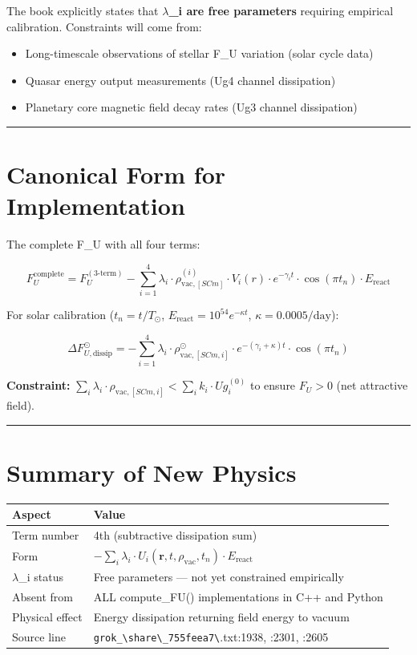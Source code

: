 \documentclass[12pt,a4paper]{article}
\begin{document}
The book explicitly states that \textbf{$\lambda$\_i are free parameters} requiring empirical calibration. Constraints will come from:

\begin{itemize}
  \item Long-timescale observations of stellar F\_U variation (solar cycle data)
  \item Quasar energy output measurements (Ug4 channel dissipation)
  \item Planetary core magnetic field decay rates (Ug3 channel dissipation)
\end{itemize}

\medskip\hrule\medskip

\section{Canonical Form for Implementation}

The complete F\_U with all four terms:

\begin{equation}
F_U^{\text{complete}} = F_U^{(3\text{-term})} - \sum_{i=1}^{4} \lambda_i \cdot \rho_{\text{vac},[SCm]}^{(i)} \cdot V_i(r) \cdot e^{-\gamma_i t} \cdot \cos(\pi t_n) \cdot E_{\text{react}}
\end{equation}

For solar calibration ($t_n = t/T_\odot$, $E_{\text{react}} = 10^{54} e^{-\kappa t}$, $\kappa = 0.0005/\text{day}$):

\begin{equation}
\Delta F_{U,\text{dissip}}^{\odot} = -\sum_{i=1}^{4} \lambda_i \cdot \rho_{\text{vac},[SCm,i]}^{\odot} \cdot e^{-(\gamma_i + \kappa)t} \cdot \cos(\pi t_n)
\end{equation}

\textbf{Constraint:} $\sum_i \lambda_i \cdot \rho_{\text{vac},[SCm,i]} < \sum_i k_i \cdot Ug_i^{(0)}$ to ensure $F_U > 0$ (net attractive field).

\medskip\hrule\medskip

\section{Summary of New Physics}

\begin{table}[H]
\centering
\small
\begin{tabularx}{\linewidth}{@{}>{\raggedright\arraybackslash}X>{\raggedright\arraybackslash}X@{}}
\toprule
Aspect & Value \tabularnewline
\midrule
Term number & 4th (subtractive dissipation sum) \tabularnewline
Form & $-\sum_i \lambda_i \cdot U_i(\mathbf{r},t,\rho_{\text{vac}},t_n) \cdot E_{\text{react}}$ \tabularnewline
$\lambda$\_i status & Free parameters --- not yet constrained empirically \tabularnewline
Absent from & ALL compute\_FU() implementations in C++ and Python \tabularnewline
Physical effect & Energy dissipation returning field energy to vacuum \tabularnewline
Source line & \texttt{grok\_\textbackslash {share\textbackslash \_755feea7\textbackslash }}.txt:1938, :2301, :2605 \tabularnewline
\bottomrule
\end{tabularx}
\end{table}
\end{document}
